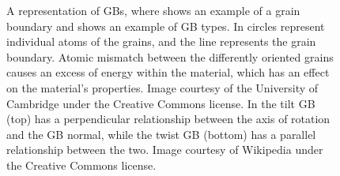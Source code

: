 \documentclass[twoside,senior]{BYUPhys}
\begin{document}
\begin{figure}[ht!]
\vspace{-20pt}
 \centering
 
 \quad
 \quad
 \caption[Examples and types of grain boundaries.]{\label{gbs} A representation of GBs, where \protect{} shows an example of a grain boundary and \protect{} shows an example of GB types.  In \protect{} circles represent individual atoms of the grains, and the line represents the grain boundary.  Atomic mismatch between the differently oriented grains causes an excess of energy within the material, which has an effect on the material's properties.  Image courtesy of the University of Cambridge under the Creative Commons license. In \protect{} the tilt GB (top) has a perpendicular relationship between the axis of rotation and the GB normal, while the twist GB (bottom) has a parallel relationship between the two.  Image courtesy of Wikipedia under the Creative Commons license.}
\end{figure}
\end{document}
